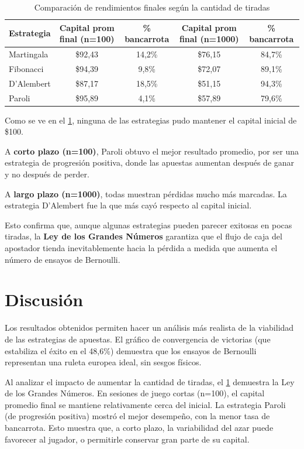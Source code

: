 \documentclass{article}
\begin{document}
\begin{table}[H]
  \centering
  \begin{tabular}{lcccc}
    \toprule
    Estrategia & Capital prom final (n=100) & \% bancarrota & Capital prom final (n=1000) & \% bancarrota \\
    \midrule
    Martingala & \$92,43 & 14,2\% & \$76,15 & 84,7\% \\
    Fibonacci  & \$94,39 & 9,8\% & \$72,07 & 89,1\% \\
    D’Alembert & \$87,17 & 18,5\% & \$51,15 & 94,3\% \\
    Paroli     & \$95,89 & 4,1\% & \$57,89 & 79,6\% \\
    \bottomrule
  \end{tabular}
  \caption{Comparación de rendimientos finales según la cantidad de tiradas}
  \label{tab:comparacion-rendimientos}
\end{table}

Como se ve en el \cref{tab:comparacion-rendimientos}, ninguna de las estrategias pudo mantener el capital inicial de \$100.

A \textbf{corto plazo (n=100)}, Paroli obtuvo el mejor resultado promedio, por ser una estrategia de progresión positiva, donde las apuestas aumentan después de ganar y no después de perder.

A \textbf{largo plazo (n=1000)}, todas muestran pérdidas mucho más marcadas. La estrategia D’Alembert fue la que más cayó respecto al capital inicial.

Esto confirma que, aunque algunas estrategias pueden parecer exitosas en pocas tiradas, la \textbf{Ley de los Grandes Números} \cite{ley_grandes_numeros} garantiza que el flujo de caja del apostador tienda inevitablemente hacia la pérdida a medida que aumenta el número de ensayos de Bernoulli.


\section{Discusión}
Los resultados obtenidos permiten hacer un análisis más realista de la viabilidad de las estrategias de apuestas. El gráfico de convergencia de victorias (que estabiliza el éxito en el 48,6\%) demuestra que los ensayos de Bernoulli representan una ruleta europea ideal, sin sesgos físicos.

Al analizar el impacto de aumentar la cantidad de tiradas, el \cref{tab:comparacion-rendimientos} demuestra la Ley de los Grandes Números. En sesiones de juego cortas (n=100), el capital promedio final se mantiene relativamente cerca del inicial. La estrategia Paroli (de progresión positiva) mostró el mejor desempeño, con la menor tasa de bancarrota. Esto muestra que, a corto plazo, la variabilidad del azar puede favorecer al jugador, o permitirle conservar gran parte de su capital.
\end{document}
